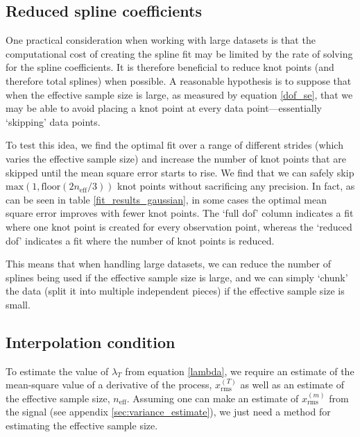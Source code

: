 \documentclass[10pt,journal]{IEEEtran}
\begin{document}
\subsection{Reduced spline coefficients} \label{reduced_coefficients}

One practical consideration when working with large datasets is that the computational cost of creating the spline fit may be limited by the rate of solving for the spline coefficients. It is therefore beneficial to reduce knot points (and therefore total splines) when possible. A reasonable hypothesis is to suppose that when the effective sample size is large, as measured by equation \ref{dof_se}, that we may be able to avoid placing a knot point at every data point---essentially `skipping' data points.

To test this idea, we find the optimal fit over a range of different strides (which varies the effective sample size) and increase the number of knot points that are skipped until the mean square error starts to rise. We find that we can safely skip $\textrm{max}(1,\textrm{floor}(2n_{\textrm{eff}}/3))$ knot points without sacrificing any precision. In fact, as can be seen in table \ref{fit_results_gaussian}, in some cases the optimal mean square error improves with fewer knot points. The `full dof' column indicates a fit where one knot point is created for every observation point, whereas the `reduced dof' indicates a fit where the number of knot points is reduced.

This means that when handling large datasets, we can reduce the number of splines being used if the effective sample size is large, and we can simply `chunk' the data (split it into multiple independent pieces) if the effective sample size is small.

\subsection{Interpolation condition} \label{interpolation_condition}

To estimate the value of $\lambda_T$ from equation \ref{lambda}, we require an estimate of the mean-square value of a derivative of the process, $x_{\textrm{rms}}^{(T)}$ as well as an estimate of the effective sample size, $n_{\textrm{eff}}$. Assuming one can make an estimate of $x_{\textrm{rms}}^{(m)}$ from the signal (see appendix \ref{sec:variance_estimate}), we just need a method for estimating the effective sample size.
\end{document}
